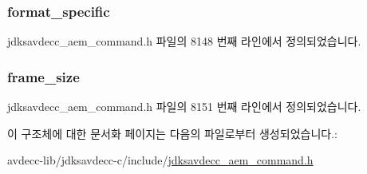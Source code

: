 \subsubsection[{\texorpdfstring{format\+\_\+specific}{format_specific}}]{ format\+\_\+specific}\hypertarget{structjdksavdecc__aem__command__set__video__format__response_acbfc36b550978f88cf0a3d9d2b2ce0dd}{}\label{structjdksavdecc__aem__command__set__video__format__response_acbfc36b550978f88cf0a3d9d2b2ce0dd}


jdksavdecc\+\_\+aem\+\_\+command.\+h 파일의 8148 번째 라인에서 정의되었습니다.

\subsubsection[{\texorpdfstring{frame\+\_\+size}{frame_size}}]{ frame\+\_\+size}\hypertarget{structjdksavdecc__aem__command__set__video__format__response_a0229abcfe4414f86dcf52c5ebf84311c}{}\label{structjdksavdecc__aem__command__set__video__format__response_a0229abcfe4414f86dcf52c5ebf84311c}


jdksavdecc\+\_\+aem\+\_\+command.\+h 파일의 8151 번째 라인에서 정의되었습니다.



이 구조체에 대한 문서화 페이지는 다음의 파일로부터 생성되었습니다.\+:\begin{DoxyCompactItemize}
\item 
avdecc-\/lib/jdksavdecc-\/c/include/\hyperlink{jdksavdecc__aem__command_8h}{jdksavdecc\+\_\+aem\+\_\+command.\+h}\end{DoxyCompactItemize}
